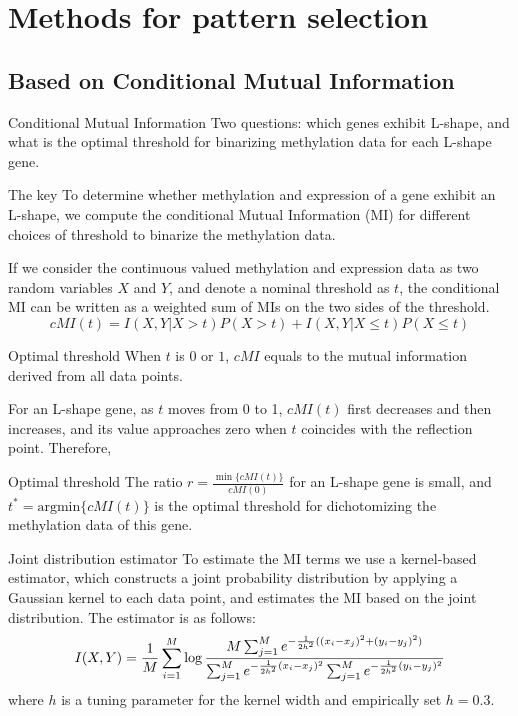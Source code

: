 \documentclass[handout]{beamer}
\begin{document}
\section{Methods for pattern selection}

\subsection{Based on Conditional Mutual Information}

\begin{frame}{Conditional Mutual Information}
Two questions: which genes exhibit
L-shape, and what is the optimal threshold for binarizing
methylation data for each L-shape gene.
\begin{block}{The key}
To determine whether methylation and expression of a gene exhibit an L-shape,
we compute the conditional Mutual Information (MI) for different choices of threshold
to binarize the methylation data.
\end{block}
If we consider the continuous valued methylation and expression data as two random variables
$X$ and $Y$, and denote a nominal threshold as $t$, the conditional MI can be written as a
weighted sum of MIs on the two sides of the threshold.
\[
\mathit{cMI}(t)=I(X,Y|X>t)P(X>t) + I(X,Y|X\le t)P(X\le t)
\]
\end{frame}

\begin{frame}{Optimal threshold}
When $t$ is $0$ or $1$, $\mathit{cMI}$ equals to the mutual information derived 
from all data points.

For an L-shape gene, as $t$ moves from 0 to 1, $\mathit{cMI}(t)$ first decreases and then
increases, and its value approaches zero when $t$ coincides with the reflection point. 
Therefore,
\begin{block}{Optimal threshold}
The ratio $r=\frac{\min\{\mathit{cMI}(t)\}}{\mathit{cMI}(0)}$ for an L-shape gene is small, 
and $t^{\ast} = \mathrm{argmin}\{ \mathit{cMI}(t) \}$ is the optimal threshold for 
dichotomizing the methylation data of this gene.
\end{block}

\end{frame}

\begin{frame}{Joint distribution estimator}
To estimate the MI terms we use a kernel-based estimator, which constructs a joint
probability distribution by applying a Gaussian kernel to each data point, and estimates
the MI based on the joint distribution. The estimator is as follows:
\[
I(X,Y) = \frac 1M \sum_{i=1}^M \log\frac{M\sum_{j=1}^M e^{-\frac{1}{2h^2}((x_i-x_j)^2+(y_i-y_j)^2)}}{%
                                      \sum_{j=1}^M e^{-\frac{1}{2h^2}(x_i-x_j)^2} \sum_{j=1}^M e^{-\frac{1}{2h^2}(y_i-y_j)^2}}
\]
where $h$ is a tuning parameter for the kernel width and empirically set $h=0.3$.
\end{frame}
\end{document}
